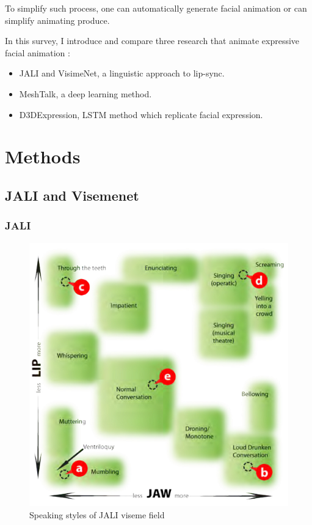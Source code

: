 \documentclass[10pt,twocolumn,letterpaper]{article}
\begin{document}
To simplify such process, one can automatically generate facial animation or can simplify animating produce.

In this survey, I introduce and compare three research that animate expressive facial animation :
\begin{itemize}
 \item JALI\cite{edwardsJALIAnimatorcentricViseme2016} and VisimeNet\cite{zhouVisemenetAudiodrivenAnimatorcentric2018}, a linguistic approach to lip-sync.
 \item MeshTalk\cite{richardMeshTalk3DFace2021}, a deep learning method.
 \item D3DExpression\cite{potamiasLearningGenerateCustomized2020}, LSTM method which replicate facial expression.
\end{itemize}





\section{Methods}

\subsection{JALI and Visemenet}

\subsubsection{JALI}

\begin{figure}
   \includegraphics[width=1.0\linewidth]{jaliStyles}
   
   \caption{Speaking styles of JALI viseme field}
   \label{fig:jaliStyles}
\end{figure}
\end{document}
